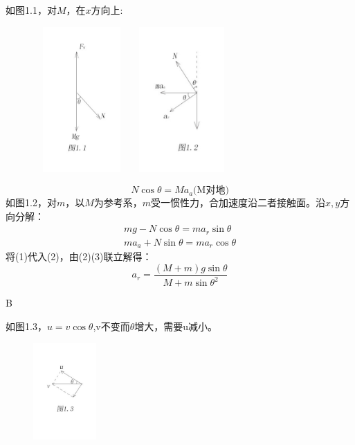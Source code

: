 \documentclass[b5paper,opensource,sourcefont,parskip]{qyxf-book}
\begin{document}
\solve 如图1.1，对$M$，在$x$方向上:
\begin{figure}[htbp]
	\centering
	\includegraphics[width=10em,height=15em]{Chp1_illus1.png}
	\quad
	\centering
	\includegraphics[width=10em,height=15em]{Chp1_illus2.png}
\end{figure}
\begin{equation}
N\cos\theta=Ma_a\text{(M对地)}
\end{equation}
如图1.2，对$m$，以$M$为参考系，$m$受一惯性力，合加速度沿二者接触面。沿$x,y$方向分解：
\begin{gather}
mg-N\cos\theta=ma_r\sin\theta\\
ma_a+N\sin\theta=ma_r\cos\theta
\end{gather}
将(1)代入(2)，由(2)(3)联立解得：
\[a_r=\dfrac{(M+m)g\sin\theta}{M+m{\sin\theta}^2}\]


B

\solve 如图1.3，$u=v\cos\theta$,v不变而$\theta$增大，需要u减小。

\begin{figure}[htbp]
	\centering
	\includegraphics[width=6.5em,height=10em]{Chp1_illus3.png}
	\label{fig:Chp1_illus2}
\end{figure}
\end{document}

